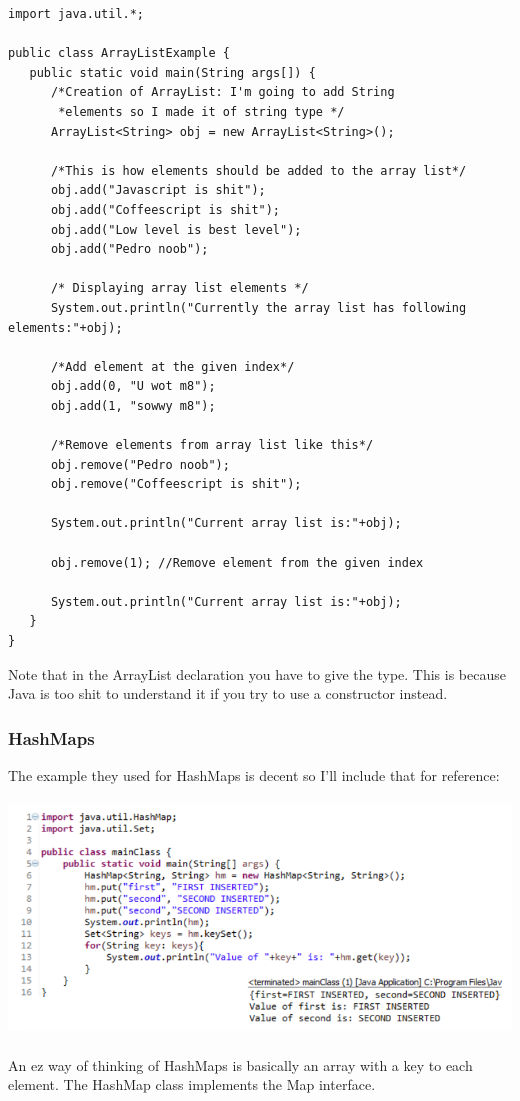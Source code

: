 \documentclass{article}
\begin{document}
\begin{lstlisting}
import java.util.*;

public class ArrayListExample {
   public static void main(String args[]) {
      /*Creation of ArrayList: I'm going to add String
       *elements so I made it of string type */
	  ArrayList<String> obj = new ArrayList<String>();

	  /*This is how elements should be added to the array list*/
	  obj.add("Javascript is shit");
	  obj.add("Coffeescript is shit");
	  obj.add("Low level is best level");
	  obj.add("Pedro noob");

	  /* Displaying array list elements */
	  System.out.println("Currently the array list has following elements:"+obj);

	  /*Add element at the given index*/
	  obj.add(0, "U wot m8");
	  obj.add(1, "sowwy m8");

	  /*Remove elements from array list like this*/
	  obj.remove("Pedro noob");
	  obj.remove("Coffeescript is shit");

	  System.out.println("Current array list is:"+obj);

	  obj.remove(1); //Remove element from the given index

	  System.out.println("Current array list is:"+obj);
   }
}
\end{lstlisting}

Note that in the ArrayList declaration you have to give the type. This is because Java is too shit to understand it if you try to use a constructor instead. 
\subsubsection{HashMaps}
The example they used for HashMaps is decent so I'll include that for reference:
\\\\
\includegraphics[scale = 0.7]{hashMap}
\\\\
An ez way of thinking of HashMaps is basically an array with a key to each element. The HashMap class implements the Map interface.
\end{document}
